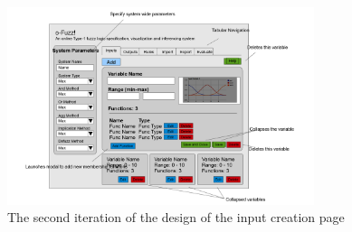 \begin{figure}[ht!]
\begin{center}
\includegraphics[width=0.8\textwidth]{images/secondItInputs}
\end{center}
\caption{The second iteration of the design of the input creation page}
\label{fig:design-secondIterationInputs}
\end{figure}
\noindent

